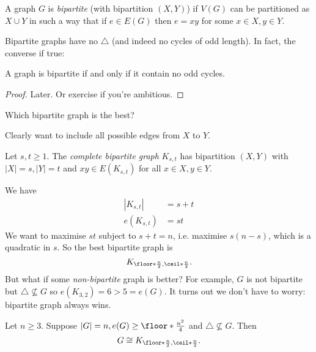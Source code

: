 \documentclass[a4paper]{article}
\begin{document}
\begin{definition}
  A graph \(G\) is \emph{bipartite} (with bipartition \((X,Y)\)) if \(V(G)\) can be partitioned as \(X\cup Y\) in such a way that if \(e\in E(G)\) then \(e=xy\) for some \(x\in X, y\in Y\).
\end{definition}

Bipartite graphs have no \(\triangle\) (and indeed no cycles of odd length). In fact, the converse if true:

\begin{theorem}
  A graph is bipartite if and only if it contain no odd cycles.
\end{theorem}

\begin{proof}
  Later. Or exercise if you're ambitious.
\end{proof}

\begin{question}
  Which bipartite graph is the best?
\end{question}

Clearly want to include all possible edges from \(X\) to \(Y\).

\begin{definition}
  Let \(s,t\geq 1\). The \emph{complete bipartite graph} \(K_{s,t}\) has bipartition \((X,Y)\) with \(|X| = s, |Y| = t\) and \(xy \in E(K_{s,t})\) for all \(x\in X, y\in Y\).
\end{definition}

We have
\begin{align*}
  |K_{s,t}| &= s+t \\
  e(K_{s,t}) &= st
\end{align*}
We want to maximise \(st\) subject to \(s+t=n\), i.e. maximise \(s(n-s)\), which is a quadratic in \(s\). So the best bipartite graph is
\[
  K_{\floor*{\frac{n}{2}}, \ceil*{\frac{n}{2}}}.
\]
But what if some \emph{non-bipartite} graph is better? For example, \(G\) is not bipartite but \(\triangle \nsubseteq G\) so \(e(K_{3,2}) = 6 > 5 = e(G)\). It turns out we don't have to worry: bipartite graph always wins.

\begin{theorem}
  Let \(n\geq 3\). Suppose \(|G| = n, e(G) \geq \floor*{\frac{n^2}{4}}\) and \(\triangle \nsubseteq G\). Then
  \[
    G \cong K_{\floor*{\frac{n}{2}}, \ceil*{\frac{n}{2}}}.
  \]
\end{theorem}
\end{document}
